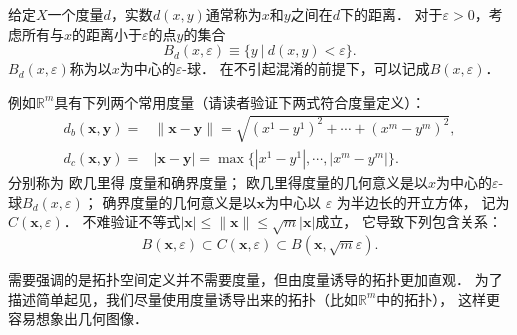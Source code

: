 给定$X$一个度量$d$，实数$d(x,y)$通常称为$x$和$y$之间在$d$下的{\heiti 距离}．
对于$\varepsilon >0$，考虑所有与$x$的距离小于$\varepsilon$的点$y$的集合
\begin{equation}\label{chtop:eqn_eball}
    B_{d}(x,\varepsilon)\equiv \{y \ |\ d(x,y)<\varepsilon\} .
\end{equation}
$B_{d}(x,\varepsilon)$称为{\heiti 以$x$为中心的$\varepsilon$-球}．
在不引起混淆的前提下，可以记成$B(x,\varepsilon)$．

例如$\mathbb{R}^m$具有下列两个常用度量（请读者验证下两式符合度量定义）：
\begin{subequations}\label{chtop:eqn_Rdbc}
    \begin{align}
        d_b(\boldsymbol{x}, \boldsymbol{y})=& \|\boldsymbol{x}-\boldsymbol{y}\|
        =\sqrt{(x^1-y^1)^2+\cdots +(x^m-y^m)^2}, \label{chtop:eqn_Rdb} \\
        d_c(\boldsymbol{x}, \boldsymbol{y})=& |\boldsymbol{x}-\boldsymbol{y}|
        =\max\{|x^1-y^1|,\cdots,|x^m-y^m| \}. \label{chtop:eqn_Rdc}
    \end{align}
\end{subequations}
分别称为 欧几里得 度量和确界度量；
欧几里得度量的几何意义是以$x$为中心的$\varepsilon$-球$B_{d}(x,\varepsilon)$；
确界度量的几何意义是以$\boldsymbol{x}$为中心以 $\varepsilon$ 为半边长的开立方体，
记为$C(\boldsymbol{x} , \varepsilon)$．
不难验证不等式$|\boldsymbol{x}| \leqslant\|\boldsymbol{x}\| \leqslant \sqrt{m}|\boldsymbol{x}|$成立，
它导致下列包含关系：
\begin{equation}\label{chtop:eqn_BCB}
    B(\boldsymbol{x} , \varepsilon) \subset C(\boldsymbol{x} , \varepsilon)
     \subset B(\boldsymbol{x} , \sqrt{m} \varepsilon) .
\end{equation}

需要强调的是拓扑空间定义并不需要度量，但由度量诱导的拓扑更加直观．
为了描述简单起见，我们尽量使用度量诱导出来的拓扑（比如$\mathbb{R}^m$中的拓扑），
这样更容易想象出几何图像．

